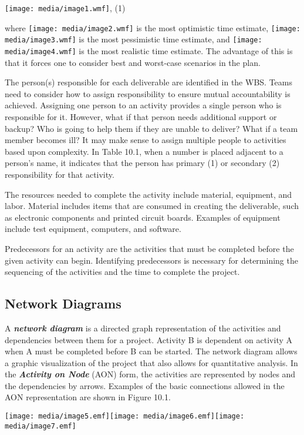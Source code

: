 \texttt{[image: media/image1.wmf]}, (1)

where \texttt{[image: media/image2.wmf]} is the most optimistic time
estimate, \texttt{[image: media/image3.wmf]} is the most pessimistic
time estimate, and \texttt{[image: media/image4.wmf]} is the most
realistic time estimate. The advantage of this is that it forces one to
consider best and worst-case scenarios in the plan.

The person(s) responsible for each deliverable are identified in the
WBS. Teams need to consider how to assign responsibility to ensure
mutual accountability is achieved. Assigning one person to an activity
provides a single person who is responsible for it. However, what if
that person needs additional support or backup? Who is going to help
them if they are unable to deliver? What if a team member becomes ill?
It may make sense to assign multiple people to activities based upon
complexity. In Table 10.1, when a number is placed adjacent to a
person's name, it indicates that the person has primary (1) or secondary
(2) responsibility for that activity.

The resources needed to complete the activity include material,
equipment, and labor. Material includes items that are consumed in
creating the deliverable, such as electronic components and printed
circuit boards. Examples of equipment include test equipment, computers,
and software.

Predecessors for an activity are the activities that must be completed
before the given activity can begin. Identifying predecessors is
necessary for determining the sequencing of the activities and the time
to complete the project.

\subsection{Network Diagrams}\label{network-diagrams}

A \emph{\textbf{network diagram}} is a directed graph representation of
the activities and dependencies between them for a project. Activity B
is dependent on activity A when A must be completed before B can be
started. The network diagram allows a graphic visualization of the
project that also allows for quantitative analysis. In the
\emph{\textbf{Activity on Node}} (AON) form, the activities are
represented by nodes and the dependencies by arrows. Examples of the
basic connections allowed in the AON representation are shown in Figure
10.1.

\texttt{[image: media/image5.emf]}\texttt{[image: media/image6.emf]}\texttt{[image: media/image7.emf]}


